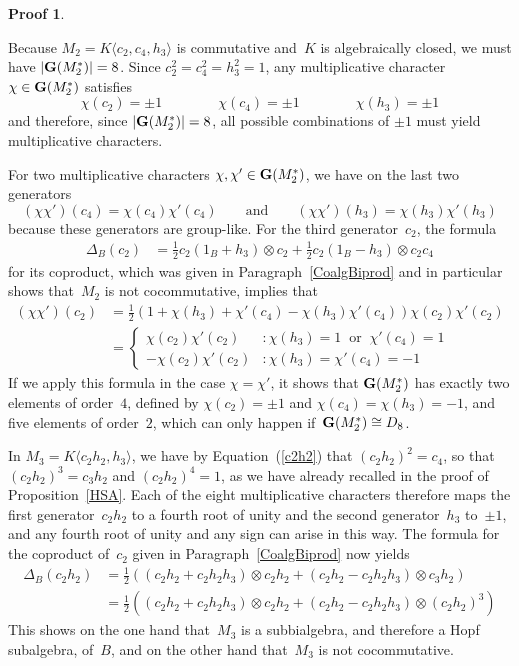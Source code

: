 \documentclass{article}
\newcounter{num}
\newenvironment{pflist}{\begin{list}{(\arabic{num})}{\usecounter{num} \leftmargin0cm \itemindent5pt}}{\end{list}}
\newcounter{num1}
\numberwithin{equation}{section}
\theoremstyle{definition}
\newtheorem*{pf}{Proof}
\theoremstyle{break}
\newcommand{\ot}{\mathbin{\otimes}}
\newcommand{\1}{{(1)}}
\newcommand{\2}{{(2)}}
\newcommand{\3}{{(3)}}
\newcommand{\db}{\Delta_{B}}
\newcommand{\B}{1_B}
\begin{document}
\begin{pf}
\begin{pflist}
\item
Because $M_2 = K\langle c_2, c_4, h_3 \rangle$ is commutative and~$K$ is algebraically closed, we must have $\left|{\bf G}(M_2^*)\right|=8$. Since $c_2^2 = c_4^2 = h_3^2 = 1$, any multiplicative character~$\chi \in {\bf G}(M_2^*)$ satisfies
\[\chi (c_2) = \pm 1 \qquad \qquad \chi (c_4) = \pm 1 \qquad \qquad \chi (h_3) = \pm 1\]
and therefore, since  $\left|{\bf G}(M_2^*)\right|=8$, all possible combinations of $\pm 1$ must yield multiplicative characters.

For two multiplicative characters $\chi, \chi' \in {\bf G}(M_2^*)$, we have on the last two generators 
\[(\chi \chi')(c_4) = \chi(c_4) \chi'(c_4) \qquad \text{and} \qquad
(\chi \chi')(h_3) = \chi(h_3) \chi'(h_3)\]
because these generators are group-like. For the third generator~$c_2$, the formula
\begin{align*}
\db(c_2) &= \frac{1}{2} c_2 (\B + h_3) \ot c_2 + \frac{1}{2} c_2 (\B - h_3) \ot c_2c_4
\end{align*}
for its coproduct, which was given in Paragraph~\ref{CoalgBiprod} and in particular shows that~$M_2$ is not cocommutative, implies that
\begin{align*}
(\chi \chi') \left( c_2 \right)  &=
\frac{1}{2} \left(1 + \chi(h_3) + \chi'(c_4) - \chi(h_3) \chi'(c_4)\right) \chi(c_2) \chi'(c_2) \\
&= \begin{cases}
\chi(c_2) \chi'(c_2) & : \chi(h_3) = 1
\mspace{10mu} \text{or} \mspace{10mu} \chi'(c_4) = 1\\
- \chi(c_2) \chi'(c_2) & : \chi(h_3) = \chi'(c_4) = -1
\end{cases}
\end{align*}
If we apply this formula in the case $\chi = \chi'$, it shows that ${\bf G}(M_2^*)$ has exactly two elements of order~$4$, defined by $\chi(c_2) = \pm 1$ and $\chi(c_4) = \chi(h_3) =- 1$, and five elements of order~$2$, which can only happen if~\mbox{${\bf G}(M_2^*) \cong D_8$}.

\item
In $M_3 = K \langle c_2 h_2, h_3 \rangle$, we have by Equation~(\ref{c2h2}) that
$(c_2 h_2)^2 = c_4$, so that $(c_2 h_2)^3 = c_3 h_2$ and $(c_2 h_2)^4 = 1$, as we have already recalled in the proof of Proposition~\ref{HSA}. Each of the eight multiplicative characters therefore maps the first generator~$c_2 h_2$ to a fourth root of unity and the second generator~$h_3$ to~$\pm 1$, and any fourth root of unity and any sign can arise in this way. The formula for the coproduct of~$c_2$ given in Paragraph~\ref{CoalgBiprod} now yields
\begin{align*}
\db(c_2 h_2) &=
\frac{1}{2}
\left(( c_2 h_2 + c_2 h_2 h_3) \ot c_2 h_2 + (c_2 h_2 - c_2 h_2 h_3) \ot c_3 h_2\right) \\
&= \frac{1}{2}
\left(( c_2 h_2 + c_2 h_2 h_3) \ot c_2 h_2 + (c_2 h_2 - c_2 h_2 h_3) \ot (c_2 h_2)^3\right)
\end{align*}
This shows on the one hand that~$M_3$ is a subbialgebra, and therefore a Hopf subalgebra, of~$B$, and on the other hand that~$M_3$ is not cocommutative.


\end{pflist}
\end{pf}
\end{document}
